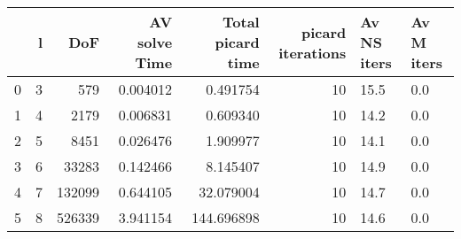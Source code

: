 \begin{tabular}{lrrrrrll}
\toprule
{} &  l &     DoF &  AV solve Time &  Total picard time &  picard iterations & Av NS iters & Av M iters \\
\midrule
0 &  3 &     579 &       0.004012 &           0.491754 &                 10 &        15.5 &        0.0 \\
1 &  4 &    2179 &       0.006831 &           0.609340 &                 10 &        14.2 &        0.0 \\
2 &  5 &    8451 &       0.026476 &           1.909977 &                 10 &        14.1 &        0.0 \\
3 &  6 &   33283 &       0.142466 &           8.145407 &                 10 &        14.9 &        0.0 \\
4 &  7 &  132099 &       0.644105 &          32.079004 &                 10 &        14.7 &        0.0 \\
5 &  8 &  526339 &       3.941154 &         144.696898 &                 10 &        14.6 &        0.0 \\
\bottomrule
\end{tabular}
